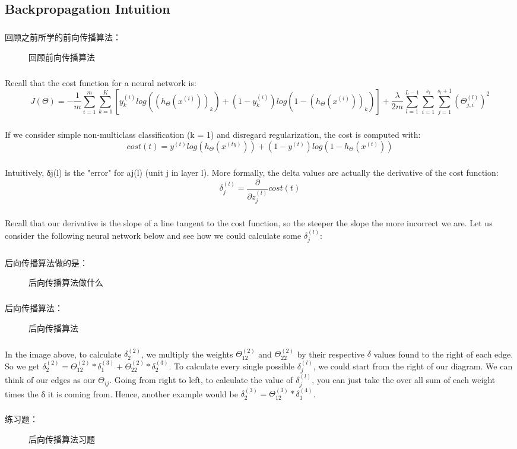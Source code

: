 \documentclass{article}
\begin{document}
\begin{CJK}{UTF8}{gbsn}
\subsection{Backpropagation Intuition}
\subparagraph{}
回顾之前所学的前向传播算法：
\begin{figure}[H]
\caption{回顾前向传播算法}
\label{fig:520}
\end{figure}
\subparagraph{}
Recall that the cost function for a neural network is:
\begin{equation}
J(\Theta)=-\frac{1}{m}\sum_{i=1}^m\sum_{k=1}^K[y_k^{(i)}log((h_\Theta(x^{(i)}))_k)+(1-y_k^{(i)})log(1-(h_\Theta(x^{(i)}))_k)]+\frac{\lambda}{2m}\sum_{l=1}^{L-1}\sum_{i=1}^{s_l}\sum_{j=1}^{s_l+1}(\Theta_{j,i}^{(l)})^2
\end{equation}
\subparagraph{}
If we consider simple non-multiclass classification (k = 1) and disregard regularization, the cost is computed with:
\begin{equation}
cost(t)=y^{(t)}log(h_\Theta(x^{(ty)}))+(1-y^{(t)})log(1-h_\Theta(x^{(t)}))
\end{equation}
\subparagraph{}
Intuitively, δj(l) is the "error" for aj(l) (unit j in layer l). More formally, the delta values are actually the derivative of the cost function:
\begin{equation}
\delta_j^{(l)}=\frac{\partial}{\partial{z_j^{(l)}}}cost(t)
\end{equation}
\subparagraph{}
Recall that our derivative is the slope of a line tangent to the cost function, so the steeper the slope the more incorrect we are. Let us consider the following neural network below and see how we could calculate some $\delta_j^{(l)}$:
\subparagraph{}
后向传播算法做的是：
\begin{figure}[H]
\caption{后向传播算法做什么}
\label{fig:521}
\end{figure}
\subparagraph{}
后向传播算法：
\begin{figure}[H]
\caption{后向传播算法}
\label{fig:523}
\end{figure}
\subparagraph{}
In the image above, to calculate $\delta_2^{(2)}$, we multiply the weights $\Theta_{12}^{(2)}$ and $\Theta_{22}^{(2)}$ by their respective $\delta$ values found to the right of each edge. So we get $\delta_2^{(2)}=\Theta_{12}^{(2)}*\delta_1^{(3)}+\Theta_{22}^{(2)}*\delta_2^{(3)}$. To calculate every single possible $\delta_j^{(l)}$, we could start from the right of our diagram. We can think of our edges as our $\Theta_{ij}$. Going from right to left, to calculate the value of $\delta_j^{(l)}$, you can just take the over all sum of each weight times the δ it is coming from. Hence, another example would be $\delta_2^{(3)}=\Theta_{12}^{(3)}*\delta_1^{(4)}$.
\subparagraph{}
练习题：
\begin{figure}[H]
\label{fig:524}
\end{figure}
\begin{figure}[H]
\caption{后向传播算法习题}
\label{fig:525}
\end{figure}

\end{CJK}
\end{document}
